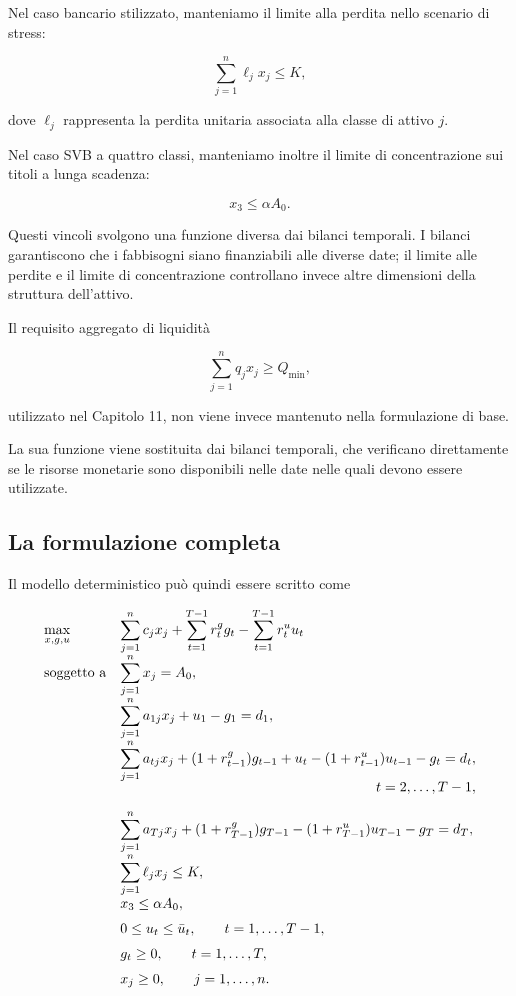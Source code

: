 Nel caso bancario stilizzato, manteniamo il limite alla perdita nello scenario
di stress:

\[
\sum_{j=1}^{n}\ell_jx_j
\leq
K,
\]

\noindent dove $\ell_j$ rappresenta la perdita unitaria associata alla classe di attivo
$j$.

Nel caso SVB a quattro classi, manteniamo inoltre il limite di concentrazione
sui titoli a lunga scadenza:

\[
x_3
\leq
\alpha A_0.
\]

Questi vincoli svolgono una funzione diversa dai bilanci temporali. I bilanci
garantiscono che i fabbisogni siano finanziabili alle diverse date; il limite
alle perdite e il limite di concentrazione controllano invece altre
dimensioni della struttura dell'attivo.

Il requisito aggregato di liquidit\`a

\[
\sum_{j=1}^{n}q_jx_j
\geq
Q_{\min},
\]

\noindent utilizzato nel Capitolo 11, non viene invece mantenuto nella formulazione di
base.

La sua funzione viene sostituita dai bilanci temporali, che verificano
direttamente se le risorse monetarie sono disponibili nelle date nelle quali
devono essere utilizzate.

\subsection{La formulazione completa}

Il modello deterministico pu\`o quindi essere scritto come

\[
\begin{array}{ll}
\max\limits_{x,g,u}
&
\displaystyle
\sum_{j=1}^{n}c_jx_j
+
\sum_{t=1}^{T-1}r^g_tg_t
-
\sum_{t=1}^{T-1}r^u_tu_t
\\[10pt]

\mbox{soggetto a}
&
\displaystyle
\sum_{j=1}^{n}x_j=A_0,
\\[10pt]

&
\displaystyle
\sum_{j=1}^{n}a_{1j}x_j+u_1-g_1=d_1,
\\[10pt]

&
\displaystyle
\sum_{j=1}^{n}a_{tj}x_j
+
(1+r^g_{t-1})g_{t-1}
+
u_t
-
(1+r^u_{t-1})u_{t-1}
-
g_t
=
d_t,
\\[-2pt]
&
\hfill t=2,\ldots,T-1,
\\[10pt]

&
\displaystyle
\sum_{j=1}^{n}a_{Tj}x_j
+
(1+r_{T-1}^{g})g_{T-1}
-
(1+r_{T-1}^{u})u_{T-1}
-
g_T
=
d_T,
\\[10pt]

&
\displaystyle
\sum_{j=1}^{n}\ell_jx_j\leq K,
\\[10pt]

&
x_3\leq\alpha A_0,
\\[6pt]

&
0\leq u_t\leq\bar u_t,
\qquad
t=1,\ldots,T-1,
\\[6pt]

&
g_t\geq0,
\qquad
t=1,\ldots,T,
\\[6pt]

&
x_j\geq0,
\qquad
j=1,\ldots,n.
\end{array}
\]

